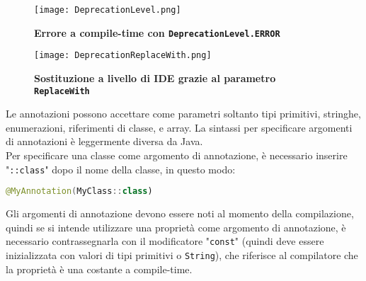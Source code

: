 \begin{figure}[ht]
  \centering
  \texttt{[image: DeprecationLevel.png]}
  \caption{{\bfseries Errore a compile-time con \texttt{DeprecationLevel.ERROR}}}
  \label{deprecationError}
\end{figure}

\begin{figure}[ht]
  \centering
  \texttt{[image: DeprecationReplaceWith.png]}
  \caption{{\bfseries Sostituzione a livello di IDE grazie al parametro \texttt{ReplaceWith}}}
  \label{deprecationWarning}
\end{figure}


Le annotazioni possono accettare come parametri soltanto tipi primitivi, stringhe, enumerazioni, riferimenti di classe, e array. La sintassi per specificare argomenti di annotazioni è leggermente diversa da Java.\\
Per specificare una classe come argomento di annotazione, è necessario inserire "\texttt{::class}" dopo il nome della classe, in questo modo:\\

\begin{lstlisting}[caption={Definizione di una annotazione personalizzata}, captionpos=b, label={lst:exAmpleAnnotCust}, language=Kotlin]
@MyAnnotation(MyClass::class)
\end{lstlisting}

Gli argomenti di annotazione devono essere noti al momento della compilazione, quindi se si intende utilizzare una proprietà come argomento di annotazione, è necessario contrassegnarla con il modificatore "\texttt{const}" (quindi deve essere inizializzata con valori di tipi primitivi o \texttt{String}), che riferisce al compilatore che la proprietà è una costante a compile-time.\\

